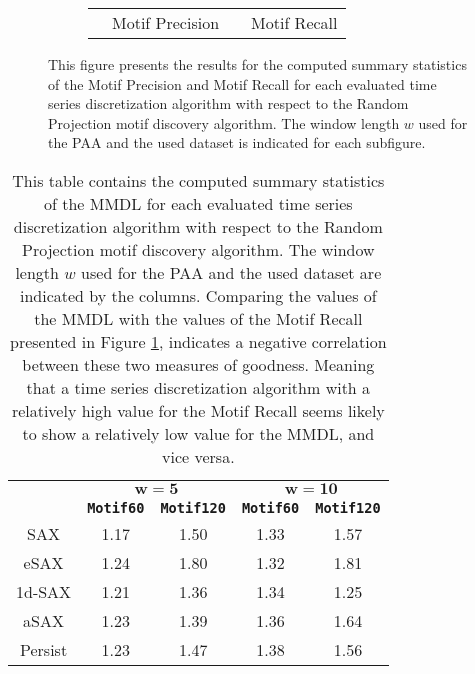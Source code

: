 \begin{figure}[H]
\begin{subfigure}[t]{0.5\textwidth}
\begin{tabular}{cccc}
\cellcolor[HTML]{4682B4} & Motif Precision & \cellcolor[HTML]{FFA500} & Motif Recall \\
\end{tabular}
\end{subfigure}
\caption[Evaluation - Motif Precision \& Motif Recall for the Random Projection]{This figure presents the results for the computed summary statistics of the Motif Precision and Motif Recall for each evaluated time series discretization algorithm with respect to the Random Projection motif discovery algorithm. The window length $w$ used for the \ac{PAA} and the used dataset is indicated for each subfigure.}
\label{fig:results_random_projection}
\end{figure}
\begin{table}[htb]
\centering
\begin{tabular}{ccccc} 
\toprule
& \multicolumn{2}{c}{$\mathbf{w = 5}$} & \multicolumn{2}{c}{$\mathbf{w = 10}$} \\
\cmidrule(lr){2-3} \cmidrule(lr){4-5}
& \texttt{\textbf{Motif60}} & \texttt{\textbf{Motif120}} & \texttt{\textbf{Motif60}} & \texttt{\textbf{Motif120}} \\
\midrule
\ac{SAX} & 1.17 & 1.50 & 1.33 & 1.57 \\
\ac{eSAX} & 1.24 & 1.80 & 1.32 & 1.81 \\
\ac{1d-SAX} & 1.21 & 1.36 & 1.34 & 1.25 \\
\ac{aSAX} & 1.23 & 1.39 & 1.36 & 1.64 \\
Persist & 1.23 & 1.47 & 1.38 & 1.56 \\
\bottomrule
\end{tabular}
\vspace*{0.5cm}
\caption[Evaluation - MMDL for the Random Projection]{This table contains the computed summary statistics of the \ac{MMDL} for each evaluated time series discretization algorithm with respect to the Random Projection motif discovery algorithm. The window length $w$ used for the \ac{PAA} and the used dataset are indicated by the columns. Comparing the values of the \ac{MMDL} with the values of the Motif Recall presented in Figure \ref{fig:results_random_projection}, indicates a negative correlation between these two measures of goodness. Meaning that a time series discretization algorithm with a relatively high value for the Motif Recall seems likely to show a relatively low value for the MMDL, and vice versa.}
\label{tab:mmdl_random_projection}
\end{table}
